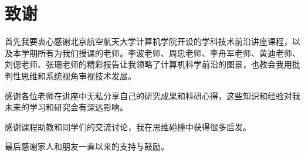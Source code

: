\chapter*{致谢}

首先我要衷心感谢北京航空航天大学计算机学院开设的学科技术前沿讲座课程，以及本学期所有为我们授课的老师。李波老师、周忠老师、李舟军老师、黄迪老师、刘偲老师、张珊老师的精彩报告让我领略了计算机科学前沿的图景，也教会我用批判性思维和系统视角审视技术发展。

感谢各位老师在讲座中无私分享自己的研究成果和科研心得，这些知识和经验对我未来的学习和研究会有深远影响。

感谢课程助教和同学们的交流讨论，我在思维碰撞中获得很多启发。

最后感谢家人和朋友一直以来的支持与鼓励。